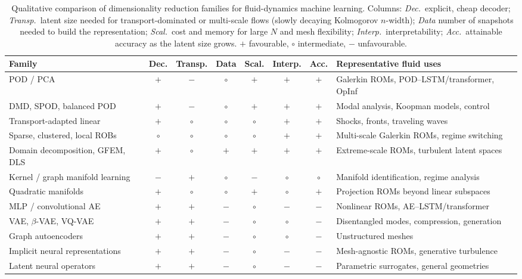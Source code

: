 \begin{table}[tbp]
\centering
\caption{Qualitative comparison of dimensionality reduction families for
fluid-dynamics machine learning. Columns: \emph{Dec.}\ explicit, cheap decoder;
\emph{Transp.}\ latent size needed for transport-dominated or multi-scale flows
(slowly decaying Kolmogorov $n$-width); \emph{Data} number of snapshots needed
to build the representation; \emph{Scal.}\ cost and memory for large $N$ and
mesh flexibility; \emph{Interp.}\ interpretability; \emph{Acc.}\ attainable
accuracy as the latent size grows. $+$ favourable, $\circ$ intermediate,
$-$ unfavourable.}
\label{tab:summary}
\footnotesize
\setlength{\tabcolsep}{3pt}
\renewcommand{\arraystretch}{1.15}
\begin{tabularx}{\textwidth}{@{}>{\raggedright\arraybackslash}p{4.3cm} *{6}{c} >{\raggedright\arraybackslash}X@{}}
\toprule
Family & Dec. & Transp. & Data & Scal. & Interp. & Acc. & Representative fluid uses \\
\midrule
POD / PCA & $+$ & $-$ & $\circ$ & $+$ & $+$ & $+$ & Galerkin ROMs, POD--LSTM/transformer, OpInf \\
DMD, SPOD, balanced POD & $+$ & $-$ & $\circ$ & $+$ & $+$ & $+$ & Modal analysis, Koopman models, control \\
Transport-adapted linear & $+$ & $\circ$ & $\circ$ & $\circ$ & $+$ & $+$ & Shocks, fronts, traveling waves \\
Sparse, clustered, local ROBs & $\circ$ & $\circ$ & $\circ$ & $\circ$ & $+$ & $+$ & Multi-scale Galerkin ROMs, regime switching \\
Domain decomposition, GFEM, DLS & $+$ & $\circ$ & $+$ & $+$ & $+$ & $+$ & Extreme-scale ROMs, turbulent latent spaces \\
Kernel / graph manifold learning & $-$ & $+$ & $\circ$ & $-$ & $\circ$ & $\circ$ & Manifold identification, regime analysis \\
Quadratic manifolds & $+$ & $\circ$ & $\circ$ & $+$ & $\circ$ & $+$ & Projection ROMs beyond linear subspaces \\
MLP / convolutional AE & $+$ & $+$ & $-$ & $\circ$ & $-$ & $-$ & Nonlinear ROMs, AE--LSTM/transformer \\
VAE, $\beta$-VAE, VQ-VAE & $+$ & $+$ & $-$ & $\circ$ & $\circ$ & $-$ & Disentangled modes, compression, generation \\
Graph autoencoders & $+$ & $+$ & $-$ & $\circ$ & $\circ$ & $-$ & Unstructured meshes \\
Implicit neural representations & $+$ & $+$ & $-$ & $\circ$ & $-$ & $-$ & Mesh-agnostic ROMs, generative turbulence \\
Latent neural operators & $+$ & $+$ & $-$ & $\circ$ & $-$ & $-$ & Parametric surrogates, general geometries \\
\bottomrule
\end{tabularx}
\end{table}

